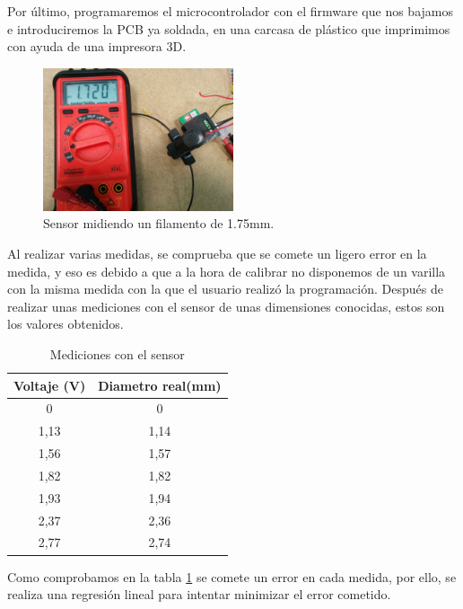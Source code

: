 Por último, programaremos el microcontrolador con el firmware que nos bajamos e introduciremos la PCB ya soldada, en una carcasa de plástico que imprimimos con ayuda de una impresora 3D.
   \begin{figure}[H]
            \centering
            \includegraphics[width=0.5\textwidth]{images/sensor/IMG_20150417_134451.jpg}
            \caption{Sensor midiendo un filamento de 1.75mm.}
            \label{fig:sens_midiendo}
    \end{figure}

Al realizar varias medidas, se comprueba que se comete un ligero error en la medida, y eso es debido a que a la hora de calibrar no disponemos de un varilla con la misma medida con la que el usuario realizó la programación. Después de realizar unas mediciones con el sensor de unas dimensiones conocidas, estos son los valores obtenidos.\\

\begin{table}[H]
\centering

\begin{tabular}{cc}
{\bf Voltaje (V)} & {\bf Diametro real(mm)} \\ \hline
0                 & 0                       \\
1,13              & 1,14                    \\
1,56              & 1,57                    \\
1,82              & 1,82                    \\
1,93              & 1,94                    \\
2,37              & 2,36                    \\
2,77              & 2,74                   
\end{tabular}
\caption{Mediciones con el sensor }
\label{tab:medici_senso}
\end{table}

Como comprobamos en la tabla \ref{tab:medici_senso} se comete un error en cada medida, por ello, se realiza una regresión lineal para intentar minimizar el error cometido.

